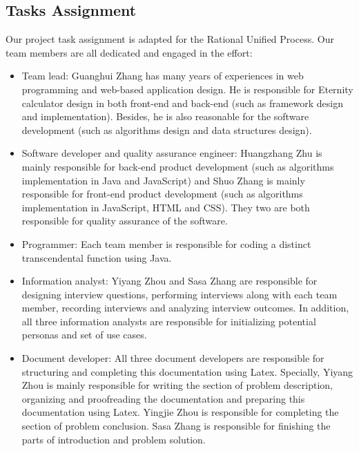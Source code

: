 \documentclass[12pt]{article}
\begin{document}
\subsection{Tasks Assignment}
Our project task assignment is adapted for the Rational Unified Process. \newline
Our team members are all dedicated and engaged in the effort:
\begin{itemize}
    \item Team lead: \newline
    Guanghui Zhang has many years of experiences in web programming and web-based application design. He is responsible for Eternity calculator design in both front-end and back-end (such as framework design and implementation). Besides, he is also reasonable for the software development (such as algorithms design and data structures design).
    \item Software developer and quality assurance engineer: \newline
    Huangzhang Zhu is mainly responsible for back-end product development (such as algorithms implementation in Java and JavaScript) and Shuo Zhang is mainly responsible for front-end product development (such as algorithms implementation in JavaScript, HTML and CSS). They two are both responsible for quality assurance of the software.
    \item Programmer: \newline
    Each team member is responsible for coding a distinct transcendental function using Java.
    \item Information analyst: \newline
    Yiyang Zhou and Sasa Zhang are responsible for designing interview questions, performing interviews along with each team member, recording interviews and analyzing interview outcomes. In addition, all three information analysts are responsible for initializing potential personas and set of use cases.
    \item Document developer: \newline
    All three document developers are responsible for structuring and completing this documentation using Latex. Specially, Yiyang Zhou is mainly responsible for writing the section of problem description, organizing and proofreading the documentation and preparing this documentation using Latex. Yingjie Zhou is responsible for completing the section of problem conclusion. Sasa Zhang is responsible for finishing the parts of introduction and problem solution.
\end{itemize}
\end{document}
